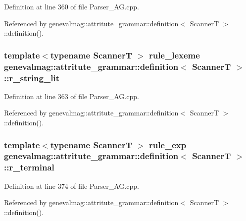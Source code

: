 Definition at line 360 of file Parser\_\-AG.cpp.



Referenced by genevalmag::attritute\_\-grammar::definition$<$ ScannerT $>$::definition().

\hypertarget{structgenevalmag_1_1attritute__grammar_1_1definition_ae79512aaef022aaef9c68f92ea4f6a85}{
\subsubsection[{r\_\-string\_\-lit}]{\setlength{\rightskip}{0pt plus 5cm}template$<$typename ScannerT $>$ {\bf rule\_\-lexeme} {\bf genevalmag::attritute\_\-grammar::definition}$<$ ScannerT $>$::{\bf r\_\-string\_\-lit}}}
\label{structgenevalmag_1_1attritute__grammar_1_1definition_ae79512aaef022aaef9c68f92ea4f6a85}


Definition at line 363 of file Parser\_\-AG.cpp.



Referenced by genevalmag::attritute\_\-grammar::definition$<$ ScannerT $>$::definition().

\hypertarget{structgenevalmag_1_1attritute__grammar_1_1definition_a80b4c09cb692c6a9467d346637ab18a5}{
\subsubsection[{r\_\-terminal}]{\setlength{\rightskip}{0pt plus 5cm}template$<$typename ScannerT $>$ {\bf rule\_\-exp} {\bf genevalmag::attritute\_\-grammar::definition}$<$ ScannerT $>$::{\bf r\_\-terminal}}}
\label{structgenevalmag_1_1attritute__grammar_1_1definition_a80b4c09cb692c6a9467d346637ab18a5}


Definition at line 374 of file Parser\_\-AG.cpp.



Referenced by genevalmag::attritute\_\-grammar::definition$<$ ScannerT $>$::definition().

